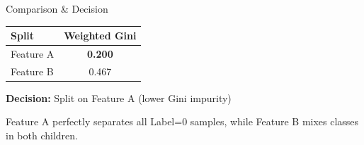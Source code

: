 \documentclass[aspectratio=169]{beamer}
\begin{document}
\begin{frame}{Comparison \& Decision}

\centering
\begin{tabular}{lc}
\toprule
Split & Weighted Gini \\
\midrule
Feature A & \textbf{0.200} \\
Feature B & 0.467 \\
\bottomrule
\end{tabular}

\vspace{1.5em}

\pause

\textbf{Decision:} Split on Feature A (lower Gini impurity)

\vspace{1em}

Feature A perfectly separates all Label=0 samples, while Feature B mixes classes in both children.

\end{frame}
\end{document}
